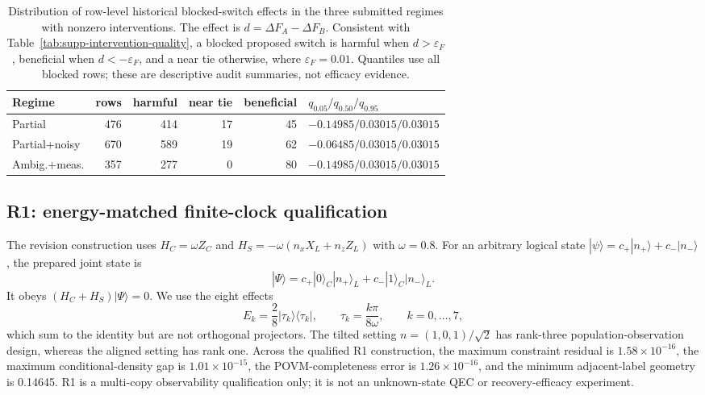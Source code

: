 \documentclass[11pt]{article}
\numberwithin{equation}{section}
\begin{document}
\begin{table}[ht]
\centering
\scriptsize
\setlength{\tabcolsep}{2.5pt}
\caption{Distribution of row-level historical blocked-switch effects in the
three submitted regimes with nonzero interventions.  The effect is
$d=\Delta F_A-\Delta F_B$.  Consistent with
Table~\ref{tab:supp-intervention-quality}, a blocked proposed switch is harmful
when $d>\varepsilon_F$, beneficial when $d<-\varepsilon_F$, and a near tie
otherwise, where $\varepsilon_F=0.01$.  Quantiles use all blocked rows; these
are descriptive audit summaries, not efficacy evidence.}
\label{tab:submitted-blocked-distribution}
\begin{tabular}{@{}lrrrrl@{}}
\toprule
Regime & rows & harmful & near tie & beneficial &
$q_{0.05}/q_{0.50}/q_{0.95}$ \\
\midrule
Partial & 476 & 414 & 17 & 45 & $-0.14985/0.03015/0.03015$ \\
Partial+noisy & 670 & 589 & 19 & 62 & $-0.06485/0.03015/0.03015$ \\
Ambig.+meas. & 357 & 277 & 0 & 80 & $-0.14985/0.03015/0.03015$ \\
\bottomrule
\end{tabular}
\end{table}

\subsection{R1: energy-matched finite-clock qualification}

The revision construction uses $H_C=\omega Z_C$ and
$H_S=-\omega(n_xX_L+n_zZ_L)$ with $\omega=0.8$.  For an arbitrary logical state
$|\psi\rangle=c_+|n_+\rangle+c_-|n_-\rangle$, the prepared joint state is
\begin{equation}
|\Psi\rangle=c_+|0\rangle_C|n_+\rangle_L+c_-|1\rangle_C|n_-\rangle_L.
\end{equation}
It obeys $(H_C+H_S)|\Psi\rangle=0$.  We use the eight effects
\begin{equation}
E_k=\frac{2}{8}|\tau_k\rangle\langle\tau_k|,
\qquad \tau_k=\frac{k\pi}{8\omega},\qquad k=0,\ldots,7,
\end{equation}
which sum to the identity but are not orthogonal projectors.  The tilted setting
$n=(1,0,1)/\sqrt2$ has rank-three population-observation design, whereas the
aligned setting has rank one.  Across the qualified R1 construction, the maximum
constraint residual is $1.58\times10^{-16}$, the maximum conditional-density gap
is $1.01\times10^{-15}$, the POVM-completeness error is
$1.26\times10^{-16}$, and the minimum adjacent-label geometry is 0.14645.
R1 is a multi-copy observability qualification only; it is not an unknown-state
QEC or recovery-efficacy experiment.
\end{document}
